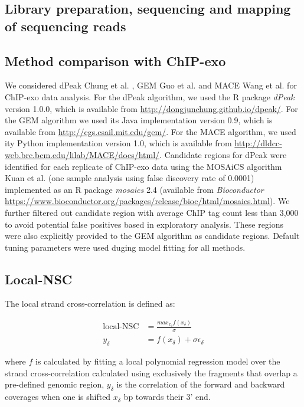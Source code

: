 \documentclass{bmcart}\usepackage[]{graphicx}\usepackage[]{color}
\begin{document}
\subsection{Library preparation, sequencing and mapping of sequencing reads}
\label{sec:library}

\color{black}

\subsection{Method comparison with ChIP-exo}
\label{sec:suppcomp}

We considered dPeak Chung et al. \cite{dpeak}, GEM Guo et
al. \cite{gem} and MACE Wang et al. \cite{mace} for ChIP-exo data
analysis. For the dPeak algorithm, we used the R package \emph{dPeak}
version 1.0.0, which is available from
\url{http://dongjunchung.github.io/dpeak/}. For the GEM algorithm we
used its Java implementation version 0.9, which is available from
\url{http://cgs.csail.mit.edu/gem/}. For the MACE algorithm, we used
ity Python implementation version 1.0, which is available from
\url{http://dldcc-web.brc.bcm.edu/lilab/MACE/docs/html/}. Candidate
regions for dPeak were identified for each replicate of ChIP-exo data
using the MOSAiCS algorithm Kuan et al. \cite{mosaics} (one sample
analysis using false discovery rate of 0.0001) implemented as an R
package \emph{mosaics} 2.4 (available from \emph{Bioconductor}
\url{https://www.bioconductor.org/packages/release/bioc/html/mosaics.html}). We
further filtered out candidate region with average ChIP tag count less
than 3,000 to avoid potential false positives based in exploratory
analysis. These regions were also explicitly provided to the GEM
algorithm as candidate regions. Default tuning parameters were used
duging model fitting for all methods.

\subsection{Local-NSC}
\label{sec:localnsc}

The local strand cross-correlation is defined as:

\begin{align}
  \mbox{local-NSC} &= \frac{max_{x_\delta} f(x_\delta)}{\sigma} \nonumber \\
 y_\delta &= f(x_\delta) + \sigma \epsilon_\delta \nonumber
\end{align}


where $f$ is calculated by fitting a local polynomial regression model
over the strand cross-correlation calculated using exclusively the
fragments that overlap a pre-defined genomic region, $y_\delta$ is the
correlation of the forward and backward coverages when one is shifted
$x_\delta$ bp towards their 3' end.
\end{document}
